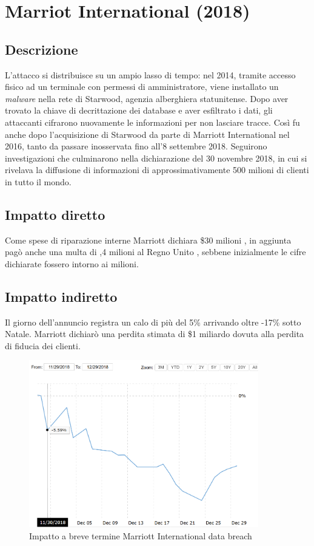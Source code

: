 \documentclass[12pt,a4paper,openright,twoside]{report}
\begin{document}
\section{Marriot International (2018)}
\subsection{Descrizione}
L'attacco si distribuisce su un ampio lasso di tempo: nel 2014, tramite accesso fisico ad un terminale con permessi di amministratore, viene installato un \textit{malware} nella rete di Starwood, agenzia alberghiera statunitense. Dopo aver trovato la chiave di decrittazione dei database e aver esfiltrato i dati, gli attaccanti cifrarono nuovamente le informazioni per non lasciare tracce. Cos\`i fu anche dopo l'acquisizione di Starwood da parte di Marriott International nel 2016, tanto da passare inosservata fino all'8 settembre 2018. Seguirono investigazioni che culminarono nella dichiarazione del 30 novembre 2018, in cui si rivelava la diffusione di informazioni di approssimativamente 500 milioni di clienti in tutto il mondo\cite{Marriott_ResGate}\cite{Marriott_customer_perception}.\\ 
\subsection{Impatto diretto}
Come spese di riparazione interne Marriott dichiara \$30 milioni \cite{Marriott_ResGate}, in aggiunta pag\`o anche una multa di ,4 milioni al Regno Unito \cite{Marriott_actual_fine}, sebbene  inizialmente le cifre dichiarate fossero intorno ai  milioni.\\ 
\subsection{Impatto indiretto}
Il giorno dell'annuncio registra un calo di pi\`u del 5\% arrivando oltre  -17\% sotto Natale. Marriott dichiar\`o una perdita stimata di \$1 miliardo dovuta alla perdita di fiducia dei clienti\cite{Marriott_ResGate}.\\

\begin{figure}[H] 
\begin{center} 
\includegraphics[width=10cm]{figures/marriott_short.png} 
\caption[Grafico Marriott short]{Impatto a breve termine Marriott International data breach}\label{fig:mrt1}
\end{center}
\end{figure}
\end{document}

